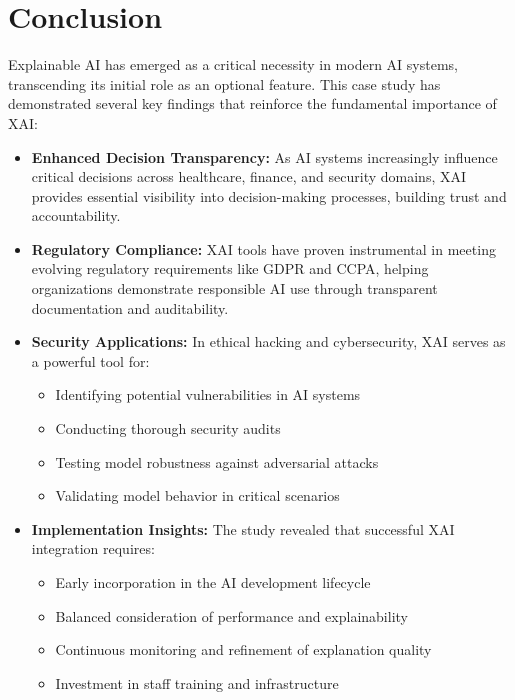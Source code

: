 \documentclass[12pt]{article}
\begin{document}
\section{Conclusion}
Explainable AI has emerged as a critical necessity in modern AI systems, transcending its initial role as an optional feature. This case study has demonstrated several key findings that reinforce the fundamental importance of XAI:

\begin{itemize}[noitemsep]
  \item \textbf{Enhanced Decision Transparency:} As AI systems increasingly influence critical decisions across healthcare, finance, and security domains, XAI provides essential visibility into decision-making processes, building trust and accountability.
  
  \item \textbf{Regulatory Compliance:} XAI tools have proven instrumental in meeting evolving regulatory requirements like GDPR and CCPA, helping organizations demonstrate responsible AI use through transparent documentation and auditability.
  
  \item \textbf{Security Applications:} In ethical hacking and cybersecurity, XAI serves as a powerful tool for:
    \begin{itemize}
      \item Identifying potential vulnerabilities in AI systems
      \item Conducting thorough security audits
      \item Testing model robustness against adversarial attacks
      \item Validating model behavior in critical scenarios
    \end{itemize}
    
  \item \textbf{Implementation Insights:} The study revealed that successful XAI integration requires:
    \begin{itemize}
      \item Early incorporation in the AI development lifecycle
      \item Balanced consideration of performance and explainability
      \item Continuous monitoring and refinement of explanation quality
      \item Investment in staff training and infrastructure
    \end{itemize}
    

\end{itemize}
\end{document}
